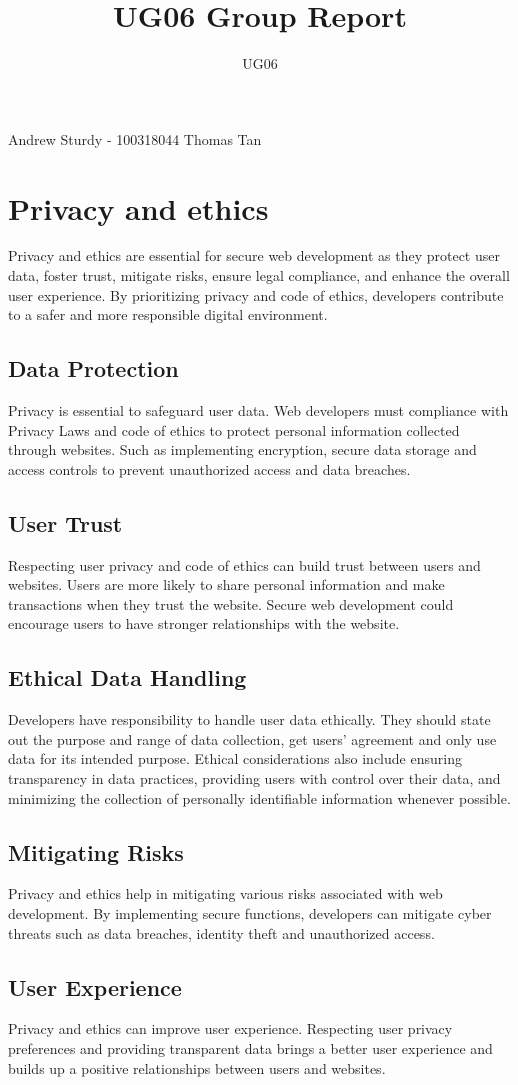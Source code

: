 \documentclass{cmpstyle}
\title{UG06 Group Report}
\author{UG06}
\begin{document}
Andrew Sturdy - 100318044\newline
Thomas\newline
Tan
\section{Privacy and ethics}
Privacy and ethics are essential for secure web development as they protect user data, foster trust, mitigate risks, ensure legal compliance, and enhance the overall user experience. By prioritizing privacy and code of ethics, developers contribute to a safer and more responsible digital environment.
\subsection{Data Protection}
Privacy is essential to safeguard user data. Web developers must compliance with Privacy Laws and code of ethics to protect personal information collected through websites. Such as implementing encryption, secure data storage and access controls to prevent unauthorized access and data breaches.
\subsection{User Trust}
Respecting user privacy and code of ethics can build trust between users and websites. Users are more likely to share personal information and make transactions when they trust the website. Secure web development could encourage users to have stronger relationships with the website.
\subsection{Ethical Data Handling}
Developers have responsibility to handle user data ethically. They should state out the purpose and range of data collection, get users' agreement and only use data for its intended purpose. Ethical considerations also include ensuring transparency in data practices, providing users with control over their data, and minimizing the collection of personally identifiable information whenever possible.
\subsection{Mitigating Risks}
Privacy and ethics help in mitigating various risks associated with web development. By implementing secure functions, developers can mitigate cyber threats such as data breaches, identity theft and unauthorized access. 
\subsection{User Experience}
Privacy and ethics can improve user experience. Respecting user privacy preferences and providing transparent data  brings a better user experience and builds up a positive relationships between users and websites.
\end{document}
